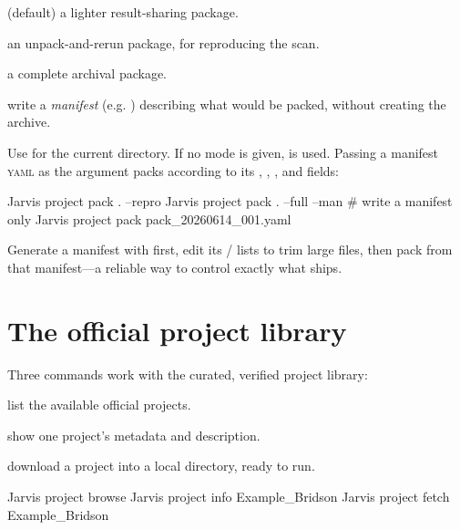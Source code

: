 \begin{description}[style=nextline, leftmargin=1.2em]
  \item[\cli{-{}-share}] (default) a lighter result-sharing package.
  \item[\cli{-{}-repro}] an unpack-and-rerun package, for reproducing the scan.
  \item[\cli{-{}-full}] a complete archival package.
  \item[\cli{-{}-man}] write a \emph{manifest} (e.g. ) describing what
        would be packed, without creating the archive.
\end{description}

\noindent Use  for the current directory. If no mode is given,  is used.
Passing a manifest \textsc{yaml} as the argument packs according to its ,
, , and  fields:

\begin{shellbox}
Jarvis project pack . --repro
Jarvis project pack . --full --man      # write a manifest only
Jarvis project pack pack_20260614_001.yaml
\end{shellbox}

\begin{jtip}
Generate a manifest with  first, edit its / lists to
trim large files, then pack from that manifest---a reliable way to control exactly what ships.
\end{jtip}

\section{The official project library}
\label{sec:proj-library}

Three commands work with the curated, verified project library:

\begin{description}[style=nextline, leftmargin=1.2em]
  \item[\cmd{browse}] list the available official projects.
  \item[\cmd{info \textnormal{\textit{name}}}] show one project's metadata and description.
  \item[\cmd{fetch \textnormal{\textit{name}}}] download a project into a local directory, ready to
        run.
\end{description}

\begin{shellbox}
Jarvis project browse
Jarvis project info Example_Bridson
Jarvis project fetch Example_Bridson
\end{shellbox}

